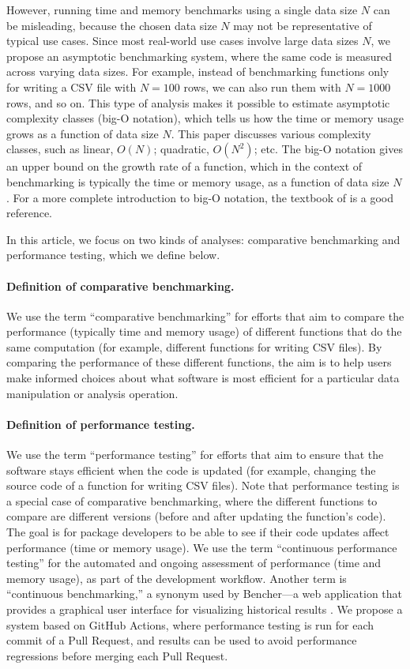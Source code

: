 However, running time and memory benchmarks using a single data size $N$ can be misleading, because the chosen data size $N$ may not be representative of typical use cases.
Since most real-world use cases involve large data sizes $N$, we propose an asymptotic benchmarking system, where the same code is measured across varying data sizes.
For example, instead of benchmarking functions only for writing a CSV file with $N = 100$ rows, we can also run them with $N = 1000$ rows, and so on. 
This type of analysis makes it possible to estimate asymptotic complexity classes (big-O notation), which tells us how the time or memory usage grows as a function of data size $N$.
This paper discusses various complexity classes, such as linear, $O(N)$; quadratic, $O(N^2)$; etc.
The big-O notation gives an upper bound on the growth rate of a function, which in the context of benchmarking is typically the time or memory usage, as a function of data size $N$.
For a more complete introduction to big-O notation, the textbook of \citet{cormen2009introduction} is a good reference.

In this article, we focus on two kinds of analyses: comparative benchmarking and performance testing, which we define below.
\paragraph{Definition of comparative benchmarking.}
We use the term ``comparative benchmarking'' for efforts that aim to compare the performance (typically time and memory usage) of different functions that do the same computation (for example, different functions for writing CSV files).
By comparing the performance of these different functions, the aim is to help users make informed choices about what software is most efficient for a particular data manipulation or analysis operation.
\paragraph{Definition of performance testing.}
We use the term ``performance testing'' for efforts that aim to ensure that the software stays efficient when the code is updated (for example, changing the source code of a function for writing CSV files). 
Note that performance testing is a special case of comparative benchmarking, where the different functions to compare are different versions (before and after updating the function's code). 
The goal is for package developers to be able to see if their code updates affect performance (time or memory usage).
We use the term ``continuous performance testing'' for the automated and ongoing assessment of performance (time and memory usage), as part of the development workflow. 
Another term is ``continuous benchmarking,'' a synonym used by Bencher---a web application that provides a graphical user interface for visualizing historical results \citep{bencher}.
We propose a system based on GitHub Actions, where performance testing is run for each commit of a Pull Request, and results can be used to avoid performance regressions before merging each Pull Request.

